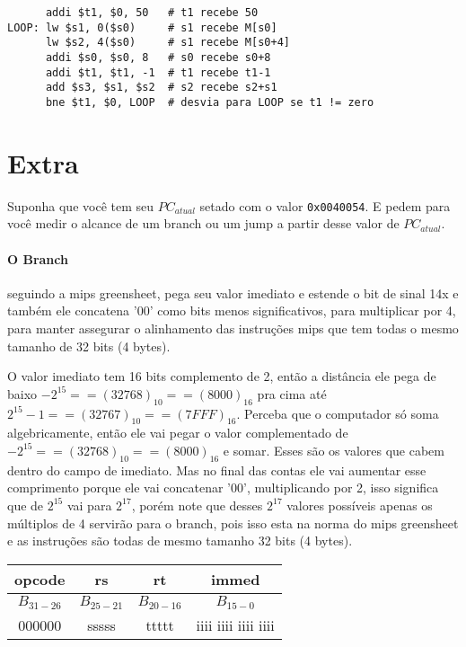 \documentclass{article}
\begin{document}
\begin{verbatim}
      addi $t1, $0, 50   # t1 recebe 50
LOOP: lw $s1, 0($s0)     # s1 recebe M[s0]
      lw $s2, 4($s0)     # s1 recebe M[s0+4]
      addi $s0, $s0, 8   # s0 recebe s0+8
      addi $t1, $t1, -1  # t1 recebe t1-1
      add $s3, $s1, $s2  # s2 recebe s2+s1
      bne $t1, $0, LOOP  # desvia para LOOP se t1 != zero
\end{verbatim}

\pagebreak
\section{Extra}

Suponha que você tem seu $PC_{atual}$ setado com o valor \verb|0x0040054|. E 
pedem para você medir o alcance de um branch ou um jump a partir desse valor de 
$PC_{atual}$.

\paragraph{O Branch} seguindo a mips greensheet, pega seu valor imediato e
estende o bit de sinal 14x e também ele concatena '00' como bits menos
significativos, para multiplicar por 4, para manter assegurar o alinhamento das
instruções mips que tem todas o mesmo tamanho de 32 bits (4 bytes).

O valor imediato tem 16 bits complemento de 2, então a distância ele pega de
baixo $-2^{15} == (32768)_{10} == (8000)_{16}$ pra cima até $2^{15} - 1 ==
(32767)_{10} == (7FFF)_{16}$. Perceba que o computador só soma algebricamente,
então ele vai pegar o valor complementado de $-2^{15} == (32768)_{10} ==
(8000)_{16}$ e somar. Esses são os valores que cabem dentro do campo de
imediato. Mas no final das contas ele vai aumentar esse comprimento porque ele
vai concatenar '00', multiplicando por 2, isso significa que de $2^{15}$ vai
para $2^{17}$, porém note que desses $2^{17}$ valores possíveis apenas os
múltiplos de 4 servirão para o branch, pois isso esta na norma do mips
greensheet e as instruções são todas de mesmo tamanho 32 bits (4 bytes).

\begin{table}[ht!]
\begin{tabular}{|c|c|c|c|}
\hline opcode & rs & rt & immed \\ 
\hline $B_{31-26}$ & $B_{25-21}$ & $B_{20-16}$ & $B_{15-0}$ \\ 
\hline 000000 & sssss & ttttt & iiii iiii iiii iiii \\ 
\hline
\end{tabular}
\end{table}
\end{document}
